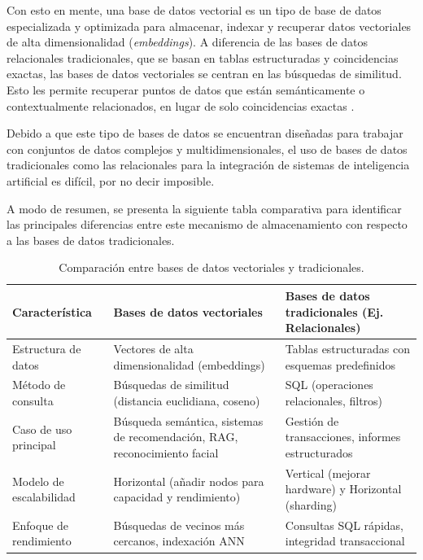 Con esto en mente, una base de datos vectorial es un tipo de base de datos especializada y optimizada para almacenar, indexar y recuperar datos vectoriales de alta dimensionalidad (\textit{embeddings}).  A diferencia de las bases de datos relacionales tradicionales, que se basan en tablas estructuradas y coincidencias exactas, las bases de datos vectoriales se centran en las búsquedas de similitud. Esto les permite recuperar puntos de datos que están semánticamente o contextualmente relacionados, en lugar de solo coincidencias exactas \cite{BD_Vectorial}.

Debido a que este tipo de bases de datos se encuentran diseñadas para trabajar con conjuntos de datos complejos y multidimensionales, el uso de bases de datos tradicionales como las relacionales para la integración de sistemas de inteligencia artificial es difícil, por no decir imposible.

A modo de resumen, se presenta la siguiente tabla comparativa para identificar las principales diferencias entre este mecanismo de almacenamiento con respecto a las bases de datos tradicionales.


\begin{table}[h]
	\centering
	\caption{Comparación entre bases de datos vectoriales y tradicionales.}
	\begin{tabular}{p{4cm}p{5cm}p{5cm}}
		\toprule
		\textbf{Característica} & \textbf{Bases de datos vectoriales} & \textbf{Bases de datos tradicionales (Ej. Relacionales)} \\
		\midrule
		Estructura de datos & Vectores de alta dimensionalidad (embeddings) & Tablas estructuradas con esquemas predefinidos \\
		Método de consulta & Búsquedas de similitud (distancia euclidiana, coseno) & SQL (operaciones relacionales, filtros) \\
		Caso de uso principal & Búsqueda semántica, sistemas de recomendación, RAG, reconocimiento facial & Gestión de transacciones, informes estructurados \\
		Modelo de escalabilidad & Horizontal (añadir nodos para capacidad y rendimiento) & Vertical (mejorar hardware) y Horizontal (sharding) \\
		Enfoque de rendimiento & Búsquedas de vecinos más cercanos, indexación ANN & Consultas SQL rápidas, integridad transaccional \\
		\bottomrule
	\end{tabular}
\end{table}





